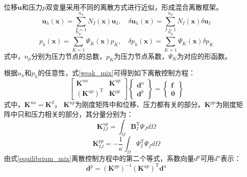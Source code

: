 位移$\boldsymbol u$和压力$p$双变量采用不同的离散方式进行近似，形成混合离散框架。
\begin{equation}\label{u_h_mix}
    \boldsymbol u_h(\boldsymbol x) = \sum_{I=1}^{n_u} N_I(\boldsymbol x) \boldsymbol u_I, \quad
    \delta \boldsymbol u_h(\boldsymbol x) = \sum_{I=1}^{n_u} N_I(\boldsymbol x) \delta \boldsymbol u_I
\end{equation}
\begin{equation}\label{p_h_mix}
    p_h(\boldsymbol x) = \sum_{K=1}^{n_p} \Psi_K(\boldsymbol x) p_K, \quad
    \delta p_h(\boldsymbol x) = \sum_{K=1}^{n_p} \Psi_K(\boldsymbol x) \delta p_K
\end{equation}
式中，$n_p$分别为压力节点的总数，$p_K$为压力节点系数，$\Psi_K$为对应的形函数。

根据$u_h$和$p_h$的任意性，式\eqref{weak_mix}可得到如下离散控制方程：
\begin{equation}\label{equilibrium_mix}
    \begin{bmatrix}
        \boldsymbol K^{uu} & \boldsymbol K^{up} \\ (\boldsymbol K^{up})^{\mathrm T} & \boldsymbol K^{pp}
    \end{bmatrix}
    \begin{Bmatrix}
        \boldsymbol d^u \\ \boldsymbol d^p 
    \end{Bmatrix} =
    \begin{Bmatrix}
        \boldsymbol f \\ \boldsymbol 0 
    \end{Bmatrix}
\end{equation}
式中，$\boldsymbol K^{uu} = \boldsymbol K^d$， $\boldsymbol{K}^{up}$为刚度矩阵中和位移、压力都有关的部分。$\boldsymbol{K}^{pp}$为刚度矩阵中只和压力相关的部分，其分量分别为：
\begin{equation}
    \boldsymbol{K}^{up}_{I J}=\int_{\Omega} \boldsymbol B_{I}^{\mathrm T} \Psi_{J} {d} \Omega
\end{equation}
\begin{equation}  
    \boldsymbol{K}^{pp}_{IJ}=-\frac{1}{\kappa}\int_{\Omega}  \Psi^\mathrm{T}_{I}  \Psi_{J}d\Omega
\end{equation}
由式\eqref{equilibrium_mix}离散控制方程中的第二个等式，系数向量$d^p$可用$d^u$表示：
\begin{equation}
    \boldsymbol d^p = (\boldsymbol K^{pp})^{-1} (\boldsymbol K^{up})^{\mathrm T} \boldsymbol d^u
\end{equation}


